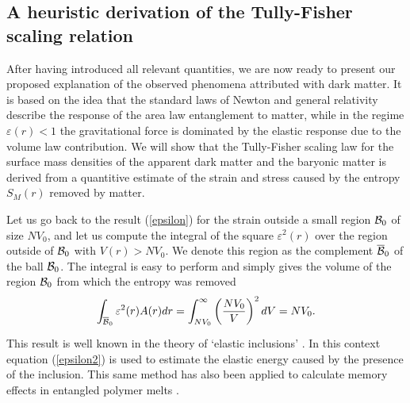 \documentclass[a4paper,12pt]{article}
\begin{document}







   



\subsection{A heuristic derivation of the Tully-Fisher scaling relation }  
 
After having introduced all relevant quantities, we are now ready to present our proposed explanation of the observed phenomena attributed with dark matter.   It is based on the idea that the standard laws of Newton and general relativity describe the response of the area law entanglement to matter, while in the regime $\varepsilon(r)\!<\!1$ the gravitational force is dominated by the elastic response due to the volume law contribution. We will show that the Tully-Fisher scaling law for the surface mass densities of the apparent dark matter and the baryonic matter is derived from a quantitive estimate of the strain and stress caused by the entropy $S_M(r)$ removed by matter. 



Let us go back to the result (\ref{epsilon}) for  the strain outside a small region ${\cal B}_0$ of size $NV_0$,  %
and let us compute the integral of the square $\varepsilon^2(r)$ over the region outside of ${\cal B}_0$ with $V(r)> NV_0$.  
We denote this region as the complement $\overline{{\cal B}}_0$ of the ball ${\cal B}_0$.  The integral is easy to perform and simply gives the volume of the region ${\cal B}_0$ from which the entropy was removed
\begin{equation}
\label{epsilon2}
\int_{\strut {\overline{\cal B}_0}}\varepsilon^2(r) A(r) dr =\int_{NV_0}^\infty  \left({NV_0\over V}\right)^2 dV = NV_0.
\end{equation}
This result is well known in the theory of `elastic inclusions' \cite{Eshelby}.   In this context equation (\ref{epsilon2}) is used to estimate the elastic energy caused by the presence of the inclusion. This same method has also been applied to calculate memory effects in entangled polymer melts \cite{RubOb}.
 
\end{document}
